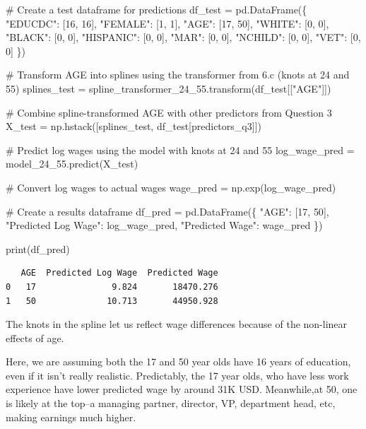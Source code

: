 \documentclass[
  11pt,
  letterpaper,
  DIV=11,
  numbers=noendperiod]{scrartcl}
\newenvironment{Shaded}{\begin{snugshade}}{\end{snugshade}}
\newcommand{\BuiltInTok}[1]{\textcolor[rgb]{0.00,0.23,0.31}{#1}}
\newcommand{\CommentTok}[1]{\textcolor[rgb]{0.37,0.37,0.37}{#1}}
\newcommand{\DecValTok}[1]{\textcolor[rgb]{0.68,0.00,0.00}{#1}}
\newcommand{\NormalTok}[1]{\textcolor[rgb]{0.00,0.23,0.31}{#1}}
\newcommand{\OperatorTok}[1]{\textcolor[rgb]{0.37,0.37,0.37}{#1}}
\newcommand{\StringTok}[1]{\textcolor[rgb]{0.13,0.47,0.30}{#1}}
\begin{document}
\begin{Shaded}
\begin{Highlighting}[]
\CommentTok{\# Create a test dataframe for predictions}
\NormalTok{df\_test }\OperatorTok{=}\NormalTok{ pd.DataFrame(\{}
    \StringTok{"EDUCDC"}\NormalTok{: [}\DecValTok{16}\NormalTok{, }\DecValTok{16}\NormalTok{],  }
    \StringTok{"FEMALE"}\NormalTok{: [}\DecValTok{1}\NormalTok{, }\DecValTok{1}\NormalTok{],     }
    \StringTok{"AGE"}\NormalTok{: [}\DecValTok{17}\NormalTok{, }\DecValTok{50}\NormalTok{],      }
    \StringTok{"WHITE"}\NormalTok{: [}\DecValTok{0}\NormalTok{, }\DecValTok{0}\NormalTok{],      }
    \StringTok{"BLACK"}\NormalTok{: [}\DecValTok{0}\NormalTok{, }\DecValTok{0}\NormalTok{],      }
    \StringTok{"HISPANIC"}\NormalTok{: [}\DecValTok{0}\NormalTok{, }\DecValTok{0}\NormalTok{],   }
    \StringTok{"MAR"}\NormalTok{: [}\DecValTok{0}\NormalTok{, }\DecValTok{0}\NormalTok{],   }
    \StringTok{"NCHILD"}\NormalTok{: [}\DecValTok{0}\NormalTok{, }\DecValTok{0}\NormalTok{],     }
    \StringTok{"VET"}\NormalTok{: [}\DecValTok{0}\NormalTok{, }\DecValTok{0}\NormalTok{]       }
\NormalTok{\})}

\CommentTok{\# Transform AGE into splines using the transformer from 6.c (knots at 24 and 55)}
\NormalTok{splines\_test }\OperatorTok{=}\NormalTok{ spline\_transformer\_24\_55.transform(df\_test[[}\StringTok{"AGE"}\NormalTok{]])}

\CommentTok{\# Combine spline{-}transformed AGE with other predictors from Question 3}
\NormalTok{X\_test }\OperatorTok{=}\NormalTok{ np.hstack([splines\_test, df\_test[predictors\_q3]])}

\CommentTok{\# Predict log wages using the model with knots at 24 and 55}
\NormalTok{log\_wage\_pred }\OperatorTok{=}\NormalTok{ model\_24\_55.predict(X\_test)}

\CommentTok{\# Convert log wages to actual wages}
\NormalTok{wage\_pred }\OperatorTok{=}\NormalTok{ np.exp(log\_wage\_pred)}

\CommentTok{\# Create a results dataframe}
\NormalTok{df\_pred }\OperatorTok{=}\NormalTok{ pd.DataFrame(\{}
    \StringTok{"AGE"}\NormalTok{: [}\DecValTok{17}\NormalTok{, }\DecValTok{50}\NormalTok{],}
    \StringTok{"Predicted Log Wage"}\NormalTok{: log\_wage\_pred,}
    \StringTok{"Predicted Wage"}\NormalTok{: wage\_pred}
\NormalTok{\})}

\BuiltInTok{print}\NormalTok{(df\_pred)}
\end{Highlighting}
\end{Shaded}

\begin{verbatim}
   AGE  Predicted Log Wage  Predicted Wage
0   17               9.824       18470.276
1   50              10.713       44950.928
\end{verbatim}

The knots in the spline let us reflect wage differences because of the
non-linear effects of age.

Here, we are assuming both the 17 and 50 year olds have 16 years of
education, even if it isn't really realistic. Predictably, the 17 year
olds, who have less work experience have lower predicted wage by around
31K USD. Meanwhile,at 50, one is likely at the top--a managing partner,
director, VP, department head, etc, making earnings much higher.
\end{document}
